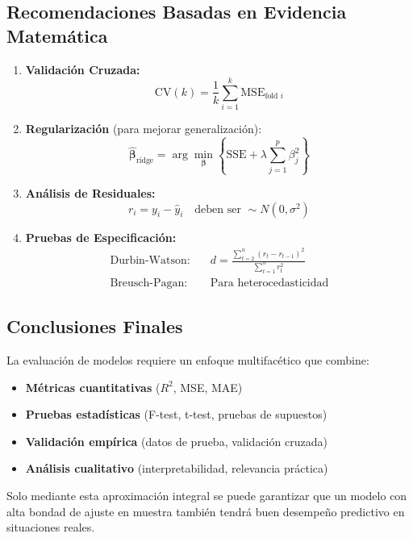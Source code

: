 \documentclass[12pt]{article}
\begin{document}
\subsection{Recomendaciones Basadas en Evidencia Matemática}

\begin{enumerate}
\item \textbf{Validación Cruzada:}
\[
\text{CV}(k) = \frac{1}{k}\sum_{i=1}^k \text{MSE}_{\text{fold } i}
\]

\item \textbf{Regularización} (para mejorar generalización):
\[
\hat{\boldsymbol{\beta}}_{\text{ridge}} = \arg\min_{\boldsymbol{\beta}} \left\{\text{SSE} + \lambda\sum_{j=1}^p \beta_j^2\right\}
\]

\item \textbf{Análisis de Residuales:}
\[
r_i = y_i - \hat{y}_i \quad \text{deben ser } \sim N(0, \sigma^2)
\]

\item \textbf{Pruebas de Especificación:}
\begin{align*}
\text{Durbin-Watson:} &\quad d = \frac{\sum_{t=2}^n (r_t - r_{t-1})^2}{\sum_{t=1}^n r_t^2} \\
\text{Breusch-Pagan:} &\quad \text{Para heterocedasticidad}
\end{align*}
\end{enumerate}

\subsection{Conclusiones Finales}

La evaluación de modelos requiere un enfoque multifacético que combine:

\begin{itemize}
\item \textbf{Métricas cuantitativas} ($R^2$, MSE, MAE)
\item \textbf{Pruebas estadísticas} (F-test, t-test, pruebas de supuestos)
\item \textbf{Validación empírica} (datos de prueba, validación cruzada)
\item \textbf{Análisis cualitativo} (interpretabilidad, relevancia práctica)
\end{itemize}

Solo mediante esta aproximación integral se puede garantizar que un modelo con alta bondad de ajuste en muestra también tendrá buen desempeño predictivo en situaciones reales.
\end{document}
